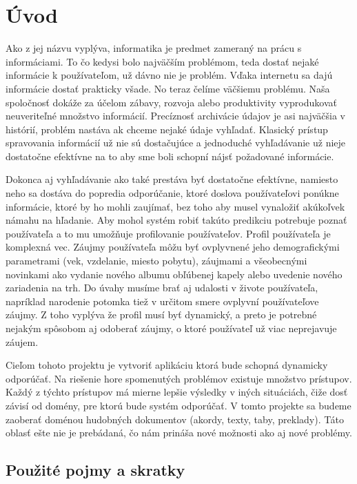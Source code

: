 \newpage 
\section{Úvod}

Ako z jej názvu vyplýva, informatika je predmet zameraný na prácu s informáciami. To čo kedysi bolo najväčším problémom, teda dostať nejaké informácie k používateľom, už dávno nie je problém. Vďaka internetu sa dajú informácie dostať prakticky všade. No teraz čelíme väčšiemu problému. Naša spoločnosť dokáže za účelom zábavy, rozvoja alebo produktivity vyprodukovať neuveriteľné množstvo informácií. Precíznosť archivácie údajov je asi najväčšia v histórií, problém nastáva ak chceme nejaké údaje vyhľadať. Klasický prístup spravovania informácií už nie sú dostačujúce a jednoduché vyhľadávanie už nieje dostatočne efektívne na to aby sme boli schopní nájsť požadované informácie.

Dokonca aj vyhľadávanie ako také prestáva byť dostatočne efektívne, namiesto neho sa dostáva do popredia odporúčanie, ktoré doslova používateľovi ponúkne informácie, ktoré by ho mohli zaujímať, bez toho aby musel vynaložiť akúkoľvek námahu na hľadanie. Aby mohol systém robiť takúto predikciu potrebuje poznať používateľa a to mu umožňuje profilovanie používateľov. Profil používateľa je komplexná vec. Záujmy používateľa môžu byť ovplyvnené jeho demografickými parametrami (vek, vzdelanie, miesto pobytu), záujmami a všeobecnými novinkami ako vydanie nového albumu obľúbenej kapely alebo uvedenie nového zariadenia na trh. Do úvahy musíme brať aj udalosti v živote používateľa, napríklad narodenie potomka tiež v určitom smere ovplyvní používateľove záujmy. Z toho vyplýva že profil musí byť dynamický, a preto je potrebné nejakým spôsobom aj odoberať záujmy, o ktoré používateľ už viac neprejavuje záujem.

Cieľom tohoto projektu je vytvoriť aplikáciu ktorá bude schopná dynamicky odporúčať. Na riešenie hore spomenutých problémov existuje množstvo prístupov. Každý z týchto prístupov má mierne lepšie výsledky v iných situáciách, čiže dosť závisí od domény, pre ktorú bude systém odporúčať. V tomto projekte sa budeme zaoberať doménou hudobných dokumentov (akordy, texty, taby, preklady). Táto oblasť ešte nie je prebádaná, čo nám prináša nové možnosti ako aj nové problémy.

\newpage
\subsection{Použité pojmy a skratky}


